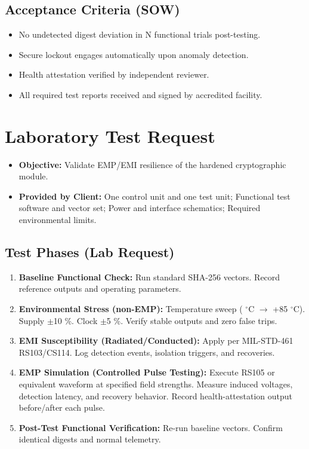 \documentclass[11pt, a4paper]{article}
\begin{document}
\subsection{Acceptance Criteria (SOW)}
\begin{itemize}
    \item No undetected digest deviation in N functional trials post-testing.
    \item Secure lockout engages automatically upon anomaly detection.
    \item Health attestation verified by independent reviewer.
    \item All required test reports received and signed by accredited facility.
\end{itemize}

\section{Laboratory Test Request}
\begin{itemize}
    \item \textbf{Objective:} Validate EMP/EMI resilience of the hardened cryptographic module.
    \item \textbf{Provided by Client:} One control unit and one test unit; Functional test software and vector set; Power and interface schematics; Required environmental limits.
\end{itemize}

\subsection{Test Phases (Lab Request)}
\begin{enumerate}
    \item \textbf{Baseline Functional Check:} Run standard SHA-256 vectors. Record reference outputs and operating parameters.
    \item \textbf{Environmental Stress (non-EMP):} Temperature sweep ( $^\circ$C $\to$ +85 $^\circ$C). Supply $\pm$10 \%. Clock $\pm$5 \%. Verify stable outputs and zero false trips.
    \item \textbf{EMI Susceptibility (Radiated/Conducted):} Apply per MIL-STD-461 RS103/CS114. Log detection events, isolation triggers, and recoveries.
    \item \textbf{EMP Simulation (Controlled Pulse Testing):} Execute RS105 or equivalent waveform at specified field strengths. Measure induced voltages, detection latency, and recovery behavior. Record health-attestation output before/after each pulse.
    \item \textbf{Post-Test Functional Verification:} Re-run baseline vectors. Confirm identical digests and normal telemetry.
\end{enumerate}
\end{document}
